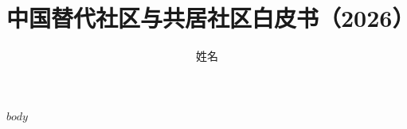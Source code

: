 \documentclass[11pt,a4paper]{article}
\title{中国替代社区与共居社区白皮书（2026）}
\author{姓名}
\begin{document}

\maketitle

$body$
\end{document}
